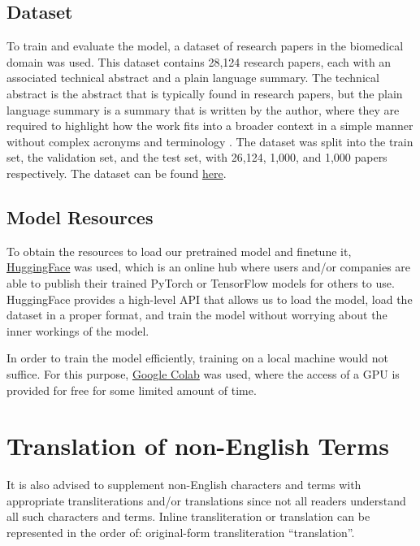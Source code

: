 \documentclass[11pt,a4paper]{article}
\begin{document}
\subsection{Dataset}
To train and evaluate the model, a dataset of research papers in the biomedical domain was used. This dataset contains 28,124 research papers, each with an associated technical abstract and a plain language summary. The technical abstract is the abstract that is typically found in research papers, but the plain language summary is a summary that is written by the author, where they are required to highlight how the work fits into a broader context in a simple manner without complex acronyms and terminology \cite{luo2022readability}. The dataset was split into the train set, the validation set, and the test set, with 26,124, 1,000, and 1,000 papers respectively. The dataset can be found \href{https://www.dropbox.
com/s/huwm01glsk9fou0/plos_readability_ctrl_sum_
corpus.rar?dl=0}{here}.

\subsection{Model Resources}

To obtain the resources to load our pretrained model and finetune it, \href{https://huggingface.co/}{HuggingFace} was used, which is an online hub where users and/or companies are able to publish their trained PyTorch or TensorFlow models for others to use. HuggingFace provides a high-level API that allows us to load the model, load the dataset in a proper format, and train the model without worrying about the inner workings of the model.

In order to train the model efficiently, training on a local machine would not suffice. For this purpose, \href{colab.research.google.com}{Google Colab} was used, where the access of a GPU is provided for free for some limited amount of time.

\section{Translation of non-English Terms}

It is also advised to supplement non-English characters and terms
with appropriate transliterations and/or translations
since not all readers understand all such characters and terms.
Inline transliteration or translation can be represented in
the order of: original-form transliteration ``translation''.
\end{document}
